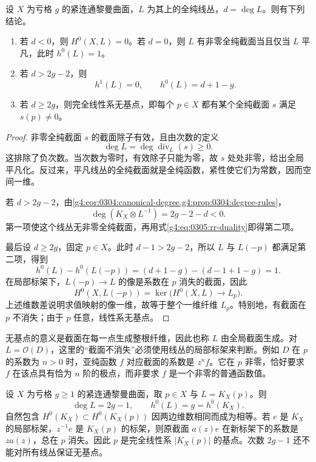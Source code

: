 \begin{theorem}\label{g4:thm:0305:high-degree-sections}
	设 \(X\) 为亏格 \(g\) 的紧连通黎曼曲面，\(L\) 为其上的全纯线丛，\(d=\deg L\)。则有下列结论。
	\begin{enumerate}
		\item 若 \(d<0\)，则 \(H^0(X,L)=0\)。若 \(d=0\)，则 \(L\) 有非零全纯截面当且仅当 \(L\) 平凡，此时 \(h^0(L)=1\)。
		\item 若 \(d>2g-2\)，则
		\[
			h^1(L)=0,\qquad h^0(L)=d+1-g.
		\]
		\item 若 \(d\ge2g\)，则完全线性系无基点，即每个 \(p\in X\) 都有某个全纯截面 \(s\) 满足 \(s(p)\ne0\)。
	\end{enumerate}
\end{theorem}
\begin{proof}
	非零全纯截面 \(s\) 的截面除子有效，且由次数的定义
	\[
		\deg L=\deg\operatorname{div}_L(s)\ge0.
	\]
	这排除了负次数。当次数为零时，有效除子只能为零，故 \(s\) 处处非零，给出全局平凡化。反过来，平凡线丛的全纯截面就是全纯函数，紧性使它们为常数，因而空间一维。

	若 \(d>2g-2\)，由\cref{g4:cor:0304:canonical-degree,g4:prop:0304:degree-rules}，
	\[
		\deg(K_X\otimes L^{-1})=2g-2-d<0.
	\]
	第一项使这个线丛无非零全纯截面，再用式\eqref{g4:eq:0305:rr-duality}即得第二项。

	最后设 \(d\ge2g\)，固定 \(p\in X\)。此时 \(d-1>2g-2\)，所以 \(L\) 与 \(L(-p)\) 都满足第二项，得到
	\[
		h^0(L)-h^0(L(-p))
		=(d+1-g)-(d-1+1-g)=1.
	\]
	在局部标架下，\(L(-p)\to L\) 的像是系数在 \(p\) 消失的截面，因此
	\[
		H^0(X,L(-p))=\ker\bigl(H^0(X,L)\longrightarrow L_p\bigr).
	\]
	上述维数差说明求值映射的像一维，故等于整个一维纤维 \(L_p\)。特别地，有截面在 \(p\) 不消失；由于 \(p\) 任意，线性系无基点。
\end{proof}

无基点的意义是截面在每一点生成整根纤维，因此也称 \(L\) 由全局截面生成。对 \(L=\mathcal O(D)\)，这里的“截面不消失”必须使用线丛的局部标架来判断。例如 \(D\) 在 \(p\) 的系数为 \(n>0\) 时，亚纯函数 \(f\) 对应截面的系数是 \(z^n f\)。它在 \(p\) 非零，恰好要求 \(f\) 在该点具有恰为 \(n\) 阶的极点，而非要求 \(f\) 是一个非零的普通函数值。

\begin{example}\label{g4:exm:0305:basepoint-bound}
	设 \(X\) 为亏格 \(g\ge1\) 的紧连通黎曼曲面，取 \(p\in X\) 与 \(L=K_X(p)\)。则
	\[
		\deg L=2g-1,\qquad h^0(L)=g=h^0(K_X).
	\]
	自然包含 \(H^0(K_X)\subset H^0(K_X(p))\) 因两边维数相同而成为相等。若 \(e\) 是 \(K_X\) 的局部标架，\(z^{-1}e\) 是 \(K_X(p)\) 的标架，则原截面 \(a(z)e\) 在新标架下的系数是 \(za(z)\)，总在 \(p\) 消失。因此 \(p\) 是完全线性系 \(|K_X(p)|\) 的基点。次数 \(2g-1\) 还不能对所有线丛保证无基点。
\end{example}

